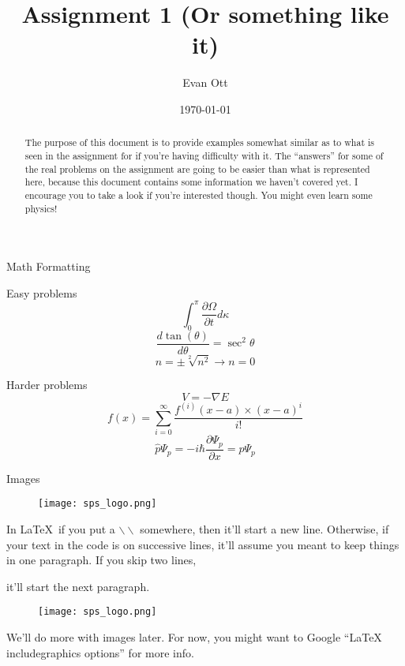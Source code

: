 \documentclass[onecolumn]{article}
\title{Assignment 1 (Or something like it)}
\author{Evan Ott}
\date{\today}
\begin{document}
\maketitle
\begin{abstract}
	The purpose of this document is to provide examples somewhat similar as to what is seen in the assignment for if you're having difficulty with it. The ``answers'' for some of the 
	real problems on the assignment are going
	to be easier than what is represented here, because this document contains some information we haven't covered yet. I encourage you to take a look if you're interested 
	though. You might even learn some physics!
\end{abstract}
\begin{section}{Math Formatting}
	\begin{subsection}{Easy problems}
		\begin{equation}
			\int_{0}^{\pi}\frac{\partial{\Omega}}{\partial{t}}d\kappa
		\end{equation}
		\begin{equation}
			\frac{d\tan(\theta)}{d\theta}=\sec^2{\theta}
		\end{equation}
		\begin{equation}
			n=\pm\sqrt[2]{n^2}\rightarrow n=0
		\end{equation}
	\end{subsection}
	\begin{subsection}{Harder problems}
		\begin{equation}
			V=-\nabla{E}
		\end{equation}
		\begin{equation}
			f(x)=\sum_{i=0}^{\infty}\frac{f^{(i)}(x-a)\times(x-a)^i}{i!}
		\end{equation}
		\begin{equation}
			\widehat{p}\Psi_p=-i\hbar\frac{\partial\Psi_p}{\partial{x}}=p\Psi_p
		\end{equation}
	\end{subsection}
\end{section}

\begin{section}{Images}
	\begin{figure}[h]
		\texttt{[image: sps\_logo.png]}
	\end{figure}
	In \LaTeX~if you put a $\backslash\backslash$ somewhere, then it'll start a new line. Otherwise, if your text in the code is
	on successive lines, it'll assume you meant to keep things in one paragraph. If you skip two lines,

	it'll start the next paragraph.
	\begin{figure}[h]
		\texttt{[image: sps\_logo.png]}
	\end{figure}
	We'll do more with images later. For now, you might want to Google ``LaTeX includegraphics options'' for more info.
\end{section}
\end{document}
